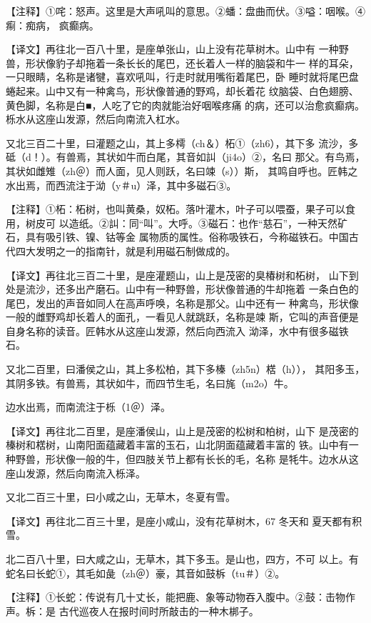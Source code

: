 \documentclass[a4paper,12pt,UTF8,twoside]{ctexbook}
\begin{document}
【注释】①咤：怒声。这里是大声吼叫的意思。②蟠：盘曲而伏。③嗌：咽喉。④痸：痴病， 疯癫病。

【译文】再往北一百八十里，是座单张山，山上没有花草树木。山中有 一种野兽，形状像豹子却拖着一条长长的尾巴，还长着人一样的脑袋和牛一 样的耳朵，一只眼睛，名称是诸犍，喜欢吼叫，行走时就用嘴衔着尾巴，卧 睡时就将尾巴盘蜷起来。山中又有一种禽鸟，形状像普通的野鸡，却长着花 纹脑袋、白色翅膀、黄色脚，名称是白■，人吃了它的肉就能治好咽喉疼痛 的病，还可以治愈疯癫病。栎水从这座山发源，然后向南流入杠水。

又北三百二十里，曰灌题之山，其上多樗（ch＆）柘①（zh6），其下多 流沙，多砥（d！）。有兽焉，其状如牛而白尾，其音如訆（ji4o）②，名曰 那父。有鸟焉，其状如雌雉（zh＠）而人面，见人则跃，名曰竦（s））斯， 其鸣自呼也。匠韩之水出焉，而西流注于泑（y＃u）泽，其中多磁石③。

【注释】①柘：柘树，也叫黄桑，奴柘。落叶灌木，叶子可以喂蚕，果子可以食用，树皮可 以造纸。②訆：同“叫”。大呼。③磁石：也作“慈石”，一种天然矿石，具有吸引铁、镍、钴等金 属物质的属性。俗称吸铁石，今称磁铁石。中国古代四大发明之一的指南针，就是利用磁石制做成的。

【译文】再往北三百二十里，是座灌题山，山上是茂密的臭椿树和柘树， 山下到处是流沙，还多出产磨石。山中有一种野兽，形状像普通的牛却拖着 一条白色的尾巴，发出的声音如同人在高声呼唤，名称是那父。山中还有一 种禽鸟，形状像一般的雌野鸡却长着人的面孔，一看见人就跳跃，名称是竦 斯，它叫的声音便是自身名称的读音。匠韩水从这座山发源，然后向西流入 泑泽，水中有很多磁铁石。

又北二百里，曰潘侯之山，其上多松柏，其下多榛（zh5n）楛（h））， 其阳多玉，其阴多铁。有兽焉，其状如牛，而四节生毛，名曰旄（m2o）牛。

边水出焉，而南流注于栎（1＠）泽。

【译文】再往北二百里，是座潘侯山，山上是茂密的松树和柏树，山下 是茂密的榛树和楛树，山南阳面蕴藏着丰富的玉石，山北阴面蕴藏着丰富的 铁。山中有一种野兽，形状像一般的牛，但四肢关节上都有长长的毛，名称 是牦牛。边水从这座山发源，然后向南流入栎泽。

又北二百三十里，曰小咸之山，无草木，冬夏有雪。

【译文】再往北二百三十里，是座小咸山，没有花草树木，67 冬天和 夏天都有积雪。

北二百八十里，曰大咸之山，无草木，其下多玉。是山也，四方，不可 以上。有蛇名曰长蛇①，其毛如彘（zh＠）豪，其音如鼓柝（tu＃）②。

【注释】①长蛇：传说有几十丈长，能把鹿、象等动物吞入腹中。②鼓：击物作声。柝：是 古代巡夜人在报时间时所敲击的一种木梆子。
\end{document}
